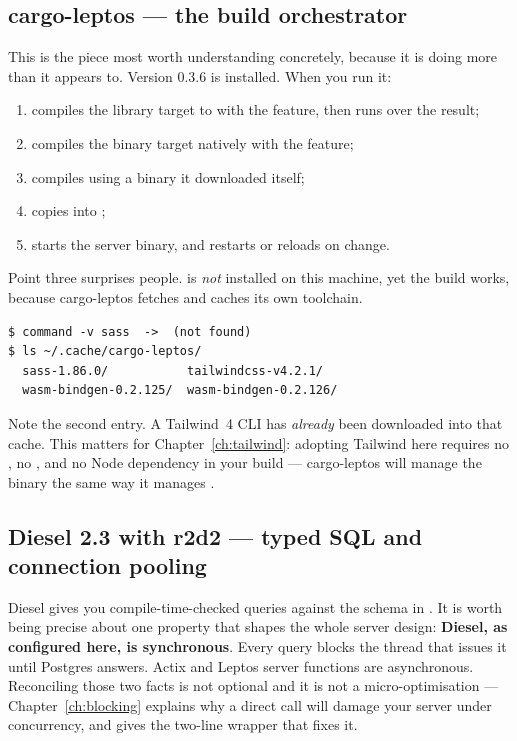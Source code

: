 \subsection*{cargo-leptos --- the build orchestrator}

This is the piece most worth understanding concretely, because it is doing more than it appears
to. Version 0.3.6 is installed. When you run  it:

\begin{enumerate}
  \item compiles the library target to  with the 
    feature, then runs  over the result;
  \item compiles the binary target natively with the  feature;
  \item compiles  using a  binary it downloaded itself;
  \item copies  into ;
  \item starts the server binary, and restarts or reloads on change.
\end{enumerate}

Point three surprises people.  is \emph{not} installed on this machine, yet the build
works, because cargo-leptos fetches and caches its own toolchain.

\begin{verified}
\begin{lstlisting}[style=out]
$ command -v sass  ->  (not found)
$ ls ~/.cache/cargo-leptos/
  sass-1.86.0/           tailwindcss-v4.2.1/
  wasm-bindgen-0.2.125/  wasm-bindgen-0.2.126/
\end{lstlisting}
\end{verified}

Note the second entry. A Tailwind~4 CLI has \emph{already} been downloaded into that cache. This
matters for Chapter~\ref{ch:tailwind}: adopting Tailwind here requires no , no
, and no Node dependency in your build --- cargo-leptos will manage the binary
the same way it manages .

\subsection*{Diesel 2.3 with r2d2 --- typed SQL and connection pooling}

Diesel gives you compile-time-checked queries against the schema in . It is
worth being precise about one property that shapes the whole server design: \textbf{Diesel, as
configured here, is synchronous}. Every query blocks the thread that issues it until Postgres
answers. Actix and Leptos server functions are asynchronous. Reconciling those two facts is not
optional and it is not a micro-optimisation --- Chapter~\ref{ch:blocking} explains why a direct
call will damage your server under concurrency, and gives the two-line wrapper that fixes it.

